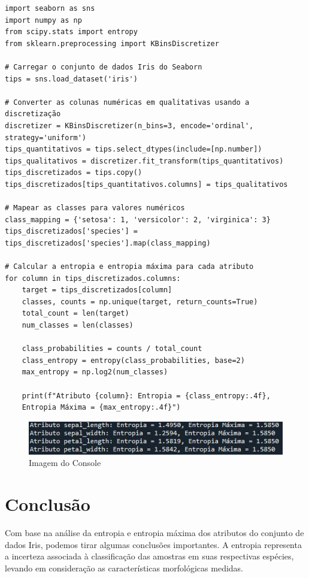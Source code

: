 \documentclass{article}
\begin{document}
\begin{verbatim}
import seaborn as sns
import numpy as np
from scipy.stats import entropy
from sklearn.preprocessing import KBinsDiscretizer

# Carregar o conjunto de dados Iris do Seaborn
tips = sns.load_dataset('iris')

# Converter as colunas numéricas em qualitativas usando a discretização
discretizer = KBinsDiscretizer(n_bins=3, encode='ordinal', strategy='uniform')
tips_quantitativos = tips.select_dtypes(include=[np.number])
tips_qualitativos = discretizer.fit_transform(tips_quantitativos)
tips_discretizados = tips.copy()
tips_discretizados[tips_quantitativos.columns] = tips_qualitativos

# Mapear as classes para valores numéricos
class_mapping = {'setosa': 1, 'versicolor': 2, 'virginica': 3}
tips_discretizados['species'] = tips_discretizados['species'].map(class_mapping)

# Calcular a entropia e entropia máxima para cada atributo
for column in tips_discretizados.columns:
    target = tips_discretizados[column]
    classes, counts = np.unique(target, return_counts=True)
    total_count = len(target)
    num_classes = len(classes)
    
    class_probabilities = counts / total_count
    class_entropy = entropy(class_probabilities, base=2)
    max_entropy = np.log2(num_classes)
    
    print(f"Atributo {column}: Entropia = {class_entropy:.4f}, 
    Entropia Máxima = {max_entropy:.4f}")

\end{verbatim}

\begin{figure}[htb]
  \centering
  \includegraphics[width=1\linewidth]{Console.JPG}
  \caption{Imagem do Console}
  \label{fig:imagem}
\end{figure}

\section{Conclusão}
Com base na análise da entropia e entropia máxima dos atributos do conjunto de dados Iris, podemos tirar algumas conclusões importantes. A entropia representa a incerteza associada à classificação das amostras em suas respectivas espécies, levando em consideração as características morfológicas medidas.
\end{document}
